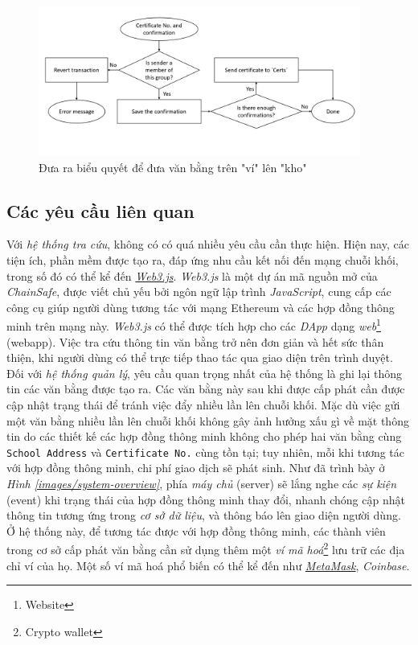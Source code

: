 \begin{figure}[!ht]
    \centering
    \includegraphics[width=400px]{anh/giai-phap/multisig-confirm-cert.png}
    \caption{Đưa ra biểu quyết để đưa văn bằng trên "ví" lên "kho"}
\end{figure}


\subsection{Các yêu cầu liên quan}
Với \textit{hệ thống tra cứu}, không có có quá nhiều yêu cầu cần thực hiện. Hiện nay, các tiện ích, phần mềm được tạo ra, đáp ứng nhu cầu kết nối đến mạng chuỗi khối, trong số đó có thể kể đến \href{https://github.com/ChainSafe/web3.js}{\textit{Web3.js}}. \textit{Web3.js} là một dự án mã nguồn mở của \textit{ChainSafe}, được viết chủ yếu bởi ngôn ngữ lập trình \textit{JavaScript}, cung cấp các công cụ giúp người dùng tương tác với mạng Ethereum và các hợp đồng thông minh trên mạng này. \textit{Web3.js} có thể được tích hợp cho các \textit{DApp} dạng \textit{web}\footnote{Website} (webapp). Việc tra cứu thông tin văn bằng trở nên đơn giản và hết sức thân thiện, khi người dùng có thể trực tiếp thao tác qua giao diện trên trình duyệt.\\

Đối với \textit{hệ thống quản lý}, yêu cầu quan trọng nhất của hệ thống là ghi lại thông tin các văn bằng được tạo ra. Các văn bằng này sau khi được cấp phát cần được cập nhật trạng thái để tránh việc đẩy nhiều lần lên chuỗi khối. Mặc dù việc gửi một văn bằng nhiều lần lên chuỗi khối không gây ảnh hưởng xấu gì về mặt thông tin do các thiết kế các hợp đồng thông minh không cho phép hai văn bằng cùng \texttt{School Address} và \texttt{Certificate No.} cùng tồn tại; tuy nhiên, mỗi khi tương tác với hợp đồng thông minh, chi phí giao dịch sẽ phát sinh. Như đã trình bày ở \textit{Hình \ref{images/system-overview}}, phía \textit{máy chủ} (server) sẽ lắng nghe các \textit{sự kiện} (event) khi trạng thái của hợp đồng thông minh thay đổi, nhanh chóng cập nhật thông tin tương ứng trong \textit{cơ sở dữ liệu}, và thông báo lên giao diện người dùng. Ở hệ thống này, để tương tác được với hợp đồng thông minh, các thành viên trong cơ sở cấp phát văn bằng cần sử dụng thêm một \textit{ví mã hoá}\footnote{Crypto wallet} lưu trữ các địa chỉ ví của họ. Một số ví mã hoá phổ biến có thể kể đến như \href{https://metamask.io/}{\textit{MetaMask}}, \textit{Coinbase}.\\

